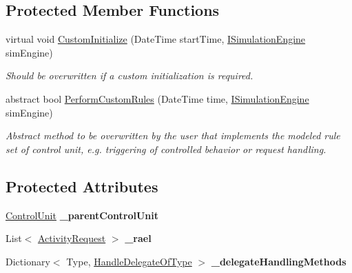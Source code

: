 \subsection*{Protected Member Functions}
\begin{DoxyCompactItemize}
\item 
virtual void \hyperlink{class_simulation_core_1_1_h_c_c_m_elements_1_1_control_unit_a90dadf257f9a054fb6083a6b1dd1d534}{Custom\+Initialize} (Date\+Time start\+Time, \hyperlink{interface_simulation_core_1_1_simulation_classes_1_1_i_simulation_engine}{I\+Simulation\+Engine} sim\+Engine)
\begin{DoxyCompactList}\small\item\em Should be overwritten if a custom initialization is required. \end{DoxyCompactList}\item 
abstract bool \hyperlink{class_simulation_core_1_1_h_c_c_m_elements_1_1_control_unit_aed1c77ff5912ad0868ba1ec8f314a698}{Perform\+Custom\+Rules} (Date\+Time time, \hyperlink{interface_simulation_core_1_1_simulation_classes_1_1_i_simulation_engine}{I\+Simulation\+Engine} sim\+Engine)
\begin{DoxyCompactList}\small\item\em Abstract method to be overwritten by the user that implements the modeled rule set of control unit, e.\+g. triggering of controlled behavior or request handling. \end{DoxyCompactList}\end{DoxyCompactItemize}
\subsection*{Protected Attributes}
\begin{DoxyCompactItemize}
\item 
\hyperlink{class_simulation_core_1_1_h_c_c_m_elements_1_1_control_unit}{Control\+Unit} {\bfseries \+\_\+parent\+Control\+Unit}\hypertarget{class_simulation_core_1_1_h_c_c_m_elements_1_1_control_unit_a6a8a073ae469cb5637b68557fb675b48}{}\label{class_simulation_core_1_1_h_c_c_m_elements_1_1_control_unit_a6a8a073ae469cb5637b68557fb675b48}

\item 
List$<$ \hyperlink{class_simulation_core_1_1_h_c_c_m_elements_1_1_activity_request}{Activity\+Request} $>$ {\bfseries \+\_\+rael}\hypertarget{class_simulation_core_1_1_h_c_c_m_elements_1_1_control_unit_acb7981efba1ca68106fa8b922c0188f0}{}\label{class_simulation_core_1_1_h_c_c_m_elements_1_1_control_unit_acb7981efba1ca68106fa8b922c0188f0}

\item 
Dictionary$<$ Type, \hyperlink{class_simulation_core_1_1_h_c_c_m_elements_1_1_control_unit_a3abd3d61b1350ae8a6f502a9f442d05e}{Handle\+Delegate\+Of\+Type} $>$ {\bfseries \+\_\+delegate\+Handling\+Methods}\hypertarget{class_simulation_core_1_1_h_c_c_m_elements_1_1_control_unit_acc4dac4b0a7eb8e57d3c3cffa0fd9c12}{}\label{class_simulation_core_1_1_h_c_c_m_elements_1_1_control_unit_acc4dac4b0a7eb8e57d3c3cffa0fd9c12}

\end{DoxyCompactItemize}
